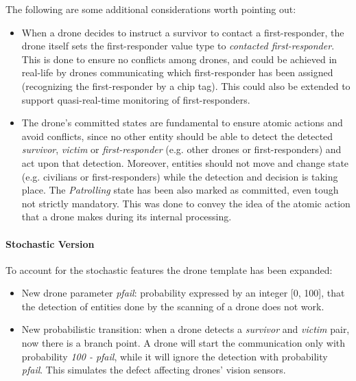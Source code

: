 The following are some additional considerations worth pointing out:
\begin{itemize}
	\item 	When a drone decides to instruct a survivor to contact a first-responder, the drone itself sets the first-responder value type to \textit{contacted first-responder}. This is done to ensure no conflicts among drones, and could be achieved in real-life by drones communicating which first-responder has been assigned (recognizing the first-responder by a chip tag). This could also be extended to support quasi-real-time monitoring of first-responders.
	\item 	The drone's committed states are fundamental to ensure atomic actions and avoid conflicts, since no other entity should be able to detect the detected \textit{survivor}, \textit{victim} or \textit{first-responder} (e.g. other drones or first-responders) and act upon that detection. Moreover, entities should not move and change state (e.g. civilians or first-responders) while the detection and decision is taking place. The \textit{Patrolling} state has been also marked as committed, even tough not strictly mandatory. This was done to convey the idea of the atomic action that a drone makes during its internal processing.
\end{itemize}

\paragraph{Stochastic Version}
To account for the stochastic features the drone template has been expanded:
\begin{itemize}
	\item New drone parameter \textit{pfail}: probability expressed by an integer [0, 100], that the detection of entities done by the scanning of a drone does not work.
	\item New probabilistic transition: when a drone detects a \textit{survivor} and \textit{victim} pair, now there is a branch point. A drone will start the communication only with probability \textit{100 - pfail}, while it will ignore the detection with probability \textit{pfail}. This simulates the defect affecting drones' vision sensors.
\end{itemize}
